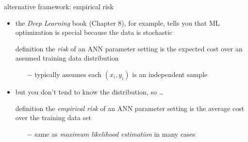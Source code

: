 \documentclass[xcolor={svgnames},
               hyperref={colorlinks,citecolor=DeepPink4,linkcolor=FireBrick,urlcolor=Maroon},
               usepdftitle=false]  %
               {beamer}
\begin{document}
\begin{frame}{alternative framework: empirical risk}

\begin{itemize}
\item the \emph{Deep Learning} book (Chapter 8), for example, tells you that ML optimization is special because the data is stochastic

\begin{block}{definition}
the \emph{risk} of an ANN parameter setting is the expected cost over an assumed  training data distribution
\end{block}

    \begin{itemize}
    \item[$-$] typically assumes each $(x_i,y_i)$ is an independent sample
    \end{itemize}

\item but you don't tend to know the distribution, so \dots

\begin{block}{definition}
the \emph{empirical risk} of an ANN parameter setting is the average cost over the training data set
\end{block}

    \begin{itemize}
    \item[$-$] same as \emph{maximum likelihood estimation} in many cases
    \end{itemize}

\end{itemize}
\end{frame}
\end{document}
